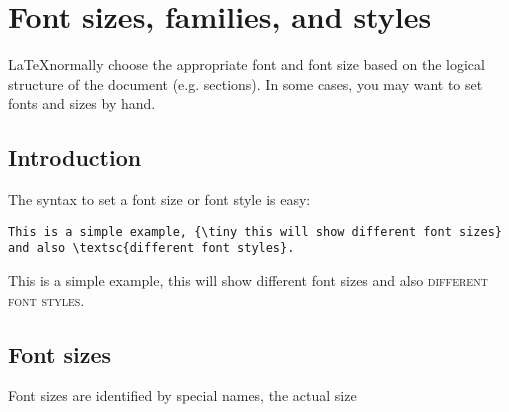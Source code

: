 
\chapter{Font sizes, families, and styles}

\LaTeX normally choose the appropriate font and font size based on the logical structure of the document (e.g. sections). In some cases, you may want to set fonts and sizes by hand.

\section{Introduction}
The syntax to set a font size or font style is easy:

\begin{lstlisting}[language={[LaTeX]TeX}]
This is a simple example, {\tiny this will show different font sizes} and also \textsc{different font styles}.
\end{lstlisting}

This is a simple example, {\tiny this will show different font sizes} and also \textsc{different font styles}.

\section{Font sizes}
Font sizes are identified by special names, the actual size